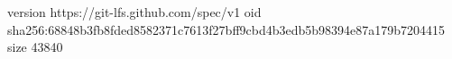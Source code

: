 version https://git-lfs.github.com/spec/v1
oid sha256:68848b3fb8fded8582371c7613f27bff9cbd4b3edb5b98394e87a179b7204415
size 43840
